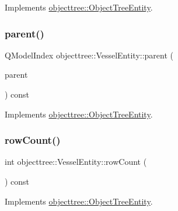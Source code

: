 Implements \mbox{\hyperlink{classobjecttree_1_1_object_tree_entity_a9ccaab3b27e65b1ed8b22f00c57a1082}{objecttree\+::\+Object\+Tree\+Entity}}.

\mbox{\label{classobjecttree_1_1_vessel_entity_a9243c501576a63cf130cd79cd649afcf}} 
\subsubsection{\texorpdfstring{parent()}{parent()}}
{\footnotesize\ttfamily Q\+Model\+Index objecttree\+::\+Vessel\+Entity\+::parent (\begin{DoxyParamCaption}\item[{const Q\+Model\+Index \&}]{parent }\end{DoxyParamCaption}) const\hspace{0.3cm}{\ttfamily [virtual]}}



Implements \mbox{\hyperlink{classobjecttree_1_1_object_tree_entity_a2d1b13c056476f87637aacd7e99e7305}{objecttree\+::\+Object\+Tree\+Entity}}.

\mbox{\label{classobjecttree_1_1_vessel_entity_a0b5216a430aa174e43ff4c8ec57d535d}} 
\subsubsection{\texorpdfstring{rowCount()}{rowCount()}}
{\footnotesize\ttfamily int objecttree\+::\+Vessel\+Entity\+::row\+Count (\begin{DoxyParamCaption}{ }\end{DoxyParamCaption}) const\hspace{0.3cm}{\ttfamily [virtual]}}



Implements \mbox{\hyperlink{classobjecttree_1_1_object_tree_entity_a82c626bb28c55dcfce11cf7ec3368588}{objecttree\+::\+Object\+Tree\+Entity}}.

\mbox{\label{classobjecttree_1_1_vessel_entity_a3711adf359039425f969a894a0044993}} 
